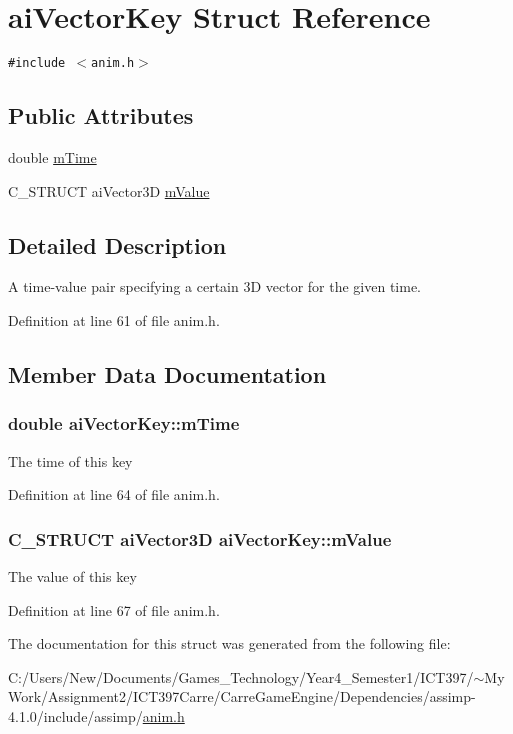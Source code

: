 \hypertarget{structai_vector_key}{
\section{aiVectorKey Struct Reference}
\label{structai_vector_key}
}
{\tt \#include $<$anim.h$>$}

\subsection*{Public Attributes}
\begin{CompactItemize}
\item 
double \hyperlink{structai_vector_key_b3c43c166434c7a505083d1929f675bc}{mTime}
\item 
C\_\-STRUCT aiVector3D \hyperlink{structai_vector_key_6f73649028b136a193dac21de35188ad}{mValue}
\end{CompactItemize}


\subsection{Detailed Description}
A time-value pair specifying a certain 3D vector for the given time. 

Definition at line 61 of file anim.h.

\subsection{Member Data Documentation}
\hypertarget{structai_vector_key_b3c43c166434c7a505083d1929f675bc}{
\subsubsection[mTime]{\setlength{\rightskip}{0pt plus 5cm}double {\bf aiVectorKey::mTime}}}
\label{structai_vector_key_b3c43c166434c7a505083d1929f675bc}


The time of this key 

Definition at line 64 of file anim.h.\hypertarget{structai_vector_key_6f73649028b136a193dac21de35188ad}{
\subsubsection[mValue]{\setlength{\rightskip}{0pt plus 5cm}C\_\-STRUCT aiVector3D {\bf aiVectorKey::mValue}}}
\label{structai_vector_key_6f73649028b136a193dac21de35188ad}


The value of this key 

Definition at line 67 of file anim.h.

The documentation for this struct was generated from the following file:\begin{CompactItemize}
\item 
C:/Users/New/Documents/Games\_\-Technology/Year4\_\-Semester1/ICT397/$\sim$My Work/Assignment2/ICT397Carre/CarreGameEngine/Dependencies/assimp-4.1.0/include/assimp/\hyperlink{anim_8h}{anim.h}\end{CompactItemize}
